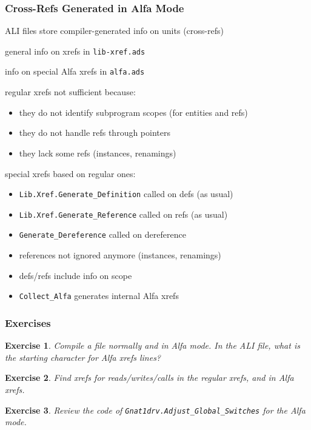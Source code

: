 \documentclass{beamer}
\newcommand{\vs}{\vspace{0.5cm}}
\newenvironment{specialframe}{%
  \begin{frame}[fragile,environment=specialframe]}{\end{frame}}
\newtheorem{exercise}{Exercise}
\newenvironment{answer}[1][Answer]{\begin{trivlist}
\item[\hskip \labelsep {\bfseries #1}]}{\end{trivlist}}
\begin{document}
\begin{specialframe}
  \frametitle{Cross-Refs Generated in Alfa Mode }

ALI files store compiler-generated info on units (cross-refs)

general info on xrefs in \verb|lib-xref.ads|

info on special Alfa xrefs in \verb|alfa.ads|

\vs

regular xrefs not sufficient because:
\begin{itemize}
\item they do not identify subprogram scopes (for entities and refs)
\item they do not handle refs through pointers
\item they lack some refs (instances, renamings)
\end{itemize}

\vs

special xrefs based on regular ones:
\begin{itemize}
\item \verb|Lib.Xref.Generate_Definition| called on defs (as usual)
\item \verb|Lib.Xref.Generate_Reference| called on refs (as usual)
\item \verb|Generate_Dereference| called on dereference
\item references not ignored anymore (instances, renamings)
\item defs/refs include info on scope
\item \verb|Collect_Alfa| generates internal Alfa xrefs
\end{itemize}

\end{specialframe}

\begin{specialframe}
  \frametitle{Exercises}

\begin{exercise}
  Compile a file normally and in Alfa mode. In the ALI file, what is the
  starting character for Alfa xrefs lines?
\end{exercise}

\visible<2>{\begin{answer}
F
\end{answer}}

\begin{exercise}
  Find xrefs for reads/writes/calls in the regular xrefs, and in Alfa xrefs.
\end{exercise}

\begin{exercise}
  Review the code of \verb|Gnat1drv.Adjust_Global_Switches| for the Alfa mode.
\end{exercise}

\end{specialframe}
\end{document}
